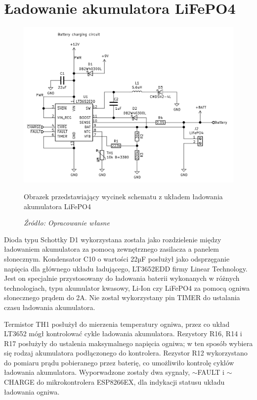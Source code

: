 \documentclass[12pt,a4paper,oneside]{memoir}
\begin{document}
\section{Ładowanie akumulatora LiFePO4}
\begin{figure}[!h]
	\centering
	\includegraphics[scale=0.2]{images/sch/sch-04.png}
	{\tytulyrozdzialow \footnotesize \caption[Schemat - ładowanie akumulatora] {Obrazek przedstawiający wycinek schematu z układem ładowania akumulatora LiFePO4}}
	\caption*{\textit{Źródło: Opracowanie własne}}
\end{figure}
\par Dioda typu Schottky D1 wykorzystana została jako rozdzielenie między ładowaniem akumulatora za pomocą zewnętrznego zasilacza a panelem słonecznym. Kondensator C10 o wartości 22µF posłużył jako odsprzęganie napięcia dla głównego układu ładującego, LT3652EDD firmy Linear Technology. Jest on specjalnie przystosowany do ładowania baterii wykonanych w różnych technologiach, typu akumulator kwasowy, Li-Ion czy LiFePO4 za pomocą ogniwa słonecznego prądem do 2A. Nie został wykorzystany pin TIMER do ustalania czasu ładowania akumulatora. 
\par Termistor TH1 posłużył do mierzenia temperatury ogniwa, przez co układ LT3652 mógł kontrolować cykle ładowania akumulatora. Rezystory R16, R14 i R17 posłużyły do ustalenia maksymalnego napięcia ogniwa; w ten sposób wybiera się rodzaj akumulatora podłączonego do kontrolera. Rezystor R12 wykorzystano do pomiaru prądu pobieranego przez baterię, co umożliwiło kontrolę cyklów ładowania akumulatora. Wyporwadzone zostały dwa sygnały, {$\sim$FAULT} i {$\sim$CHARGE} do mikrokontrolera ESP8266EX, dla indykacji statusu układu ładowania ogniwa.
\end{document}
